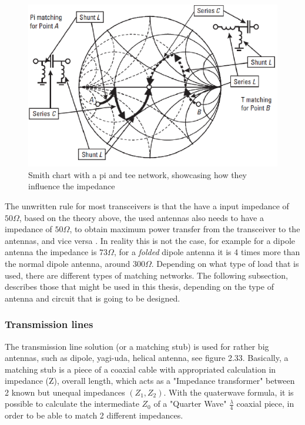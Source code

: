 \begin{figure}[h]
\centering
\includegraphics[scale=0.8]{figures/PiTeeSmithChart.PNG}
\caption{Smith chart\cite{SmithChart} with a pi and tee network, showcasing how they influence the impedance}
\end{figure}

The unwritten rule for most transceivers is that the have a input impedance of $50\Omega$, based on the theory above, the used antennas also needs to have a impedance of $50\Omega$, to obtain maximum power transfer from the transceiver to the antennas, and vice versa . In reality this is not the case, for example for a dipole antenna the impedance is $73\Omega$, for a \textit{folded} dipole antenna it is 4 times more than the normal dipole antenna, around $300\Omega$. Depending on what type of load that is used, there are different types of matching networks. The following subsection, describes those that might be used in this thesis, depending on the type of antenna and circuit that is going to be designed.

\subsubsection{Transmission lines}
The transmission line solution (or a matching stub) is used for rather big antennas, such as dipole, yagi-uda, helical antenna, see figure 2.33. Basically, a matching stub is a piece of a coaxial cable with appropriated calculation in impedance (Z), overall length, which acts as a "Impedance transformer" between 2 known but unequal impedances $(Z_1,Z_2)$. With the quaterwave formula, it is possible to calculate the intermediate $Z_0$ of a "Quarter Wave" $\frac{\lambda}{4}$ coaxial piece, in order to be able to match 2 different impedances. 

